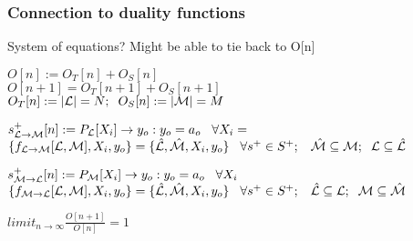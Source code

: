 \documentclass[11pt]{article}
\begin{document}
\subsubsection{Connection to duality functions}
System of equations? Might be able to tie back to O[n]
\begin{center}
\vspace{2mm}
$
O[n] := O_T[n] + O_S[n]
$
\\ \vspace{2mm}
$
O[n+1] = O_T[n+1] + O_S[n+1]
$
\\ \vspace{2mm}
$
O_T[n] := |\mathcal{L}| = N; \hspace{2mm} O_S[n] := |\mathcal{M}| = M
$
\\ \vspace{6mm}




$
s_{\mathcal{L} \rightarrow \mathcal{M}}^+\lbrack n \rbrack := P_{\mathcal{L}} \lbrack X_i \rbrack \rightarrow y_{o} : y_o = a_{o} \hspace{3mm} \forall X_i =
$
\\ \vspace{2mm}
$
\{f_{\mathcal{L} \rightarrow \mathcal{M}}[\mathcal{L},\mathcal{M}],X_i,y_o\} = \{ \hat{\mathcal{L}},\hat{\mathcal{M}},X_i,y_o\}  \hspace{3mm} \forall s^+ \in S^+; \hspace{3mm} \hat{\mathcal{M}} \subseteq \mathcal{M}; \hspace{2mm} \mathcal{L} \subseteq \hat{\mathcal{L}}
$
\\ \vspace{8mm}




$
s_{\mathcal{M} \rightarrow \mathcal{L}}^+\lbrack n \rbrack := P_{\mathcal{M}} \lbrack X_i \rbrack \rightarrow y_{o} : y_o = a_{o} \hspace{3mm} \forall X_i
$
\\ \vspace{2mm}
$
\{f_{\mathcal{M} \rightarrow \mathcal{L}}[\mathcal{L},\mathcal{M}],X_i,y_o\} = \{ \hat{\mathcal{L}},\hat{\mathcal{M}},X_i,y_o\}  \hspace{3mm} \forall s^+ \in S^+; \hspace{3mm} \hat{\mathcal{L}} \subseteq \mathcal{L}; \hspace{2mm} \mathcal{M} \subseteq \hat{\mathcal{M}}
$
\\ \vspace{6mm}







$
limit_{n \rightarrow \infty} \frac{O[n+1]}{O[n]} = 1
$




\end{center}
\end{document}
